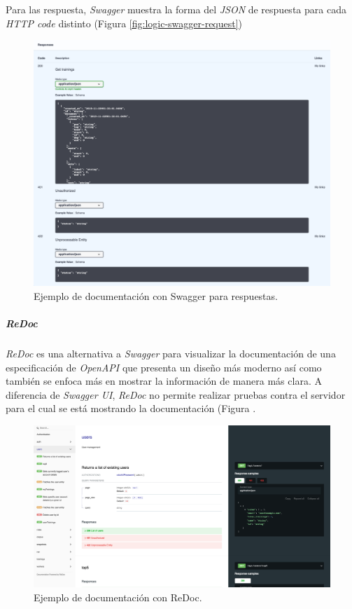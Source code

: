 \documentclass[12pt,a4paper,]{scrartcl}
\let\oldsubparagraph\subparagraph
\renewcommand{\subparagraph}[1]{\oldsubparagraph{#1}\mbox{}}
\begin{document}
Para las respuesta, \emph{Swagger} muestra la forma del \emph{JSON} de respuesta para cada \emph{HTTP code} distinto (Figura \ref{fig:logic-swagger-request})

\begin{figure}[H]

{\centering \includegraphics{assets/logic/swagger-responses.pdf} 

}

\caption{Ejemplo de documentación con Swagger para respuestas.}\label{fig:logic-swagger-responses}
\end{figure}

\hypertarget{redoc}{%
\subparagraph{\texorpdfstring{\emph{ReDoc}}{ReDoc}}\label{redoc}}

\emph{ReDoc} es una alternativa a \emph{Swagger} para visualizar la documentación de una especificación de \emph{OpenAPI} que presenta un diseño más moderno así como también se enfoca más en mostrar la información de manera más clara. A diferencia de \emph{Swagger UI}, \emph{ReDoc} no permite realizar pruebas contra el servidor para el cual se está mostrando la documentación (Figura .

\begin{figure}[H]

{\centering \includegraphics{assets/logic/redoc-main.pdf} 

}

\caption{Ejemplo de documentación con ReDoc.}\label{fig:logic-redoc-main}
\end{figure}
\end{document}
